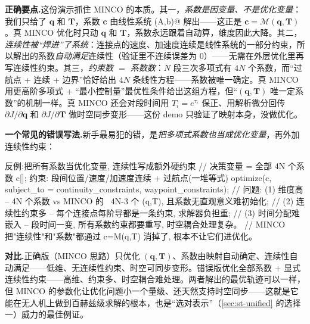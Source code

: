 \noindent\textbf{正确要点.}\;这份演示抓住 MINCO 的本质。其一，\emph{系数是因变量、不是优化变量}：我们只给了 $\mathbf q$ 和 $\mathbf T$，系数 $\mathbf c$ 由线性系统 \verb@Solve(A,b)@ 解出——这正是 $\mathbf c=\mathcal M(\mathbf q,\mathbf T)$。真 MINCO 优化时只动 $\mathbf q$ 和 $\mathbf T$，系数永远跟着自动算，维度因此大降。其二，\emph{连续性被“焊进”了系统}：连接点的速度、加速度连续是线性系统的一部分约束，所以解出的系数\emph{自动满足}连续性（验证里不连续误差为 $0$）——无需在外层优化里再写连续性约束。其三，\emph{约束数 $=$ 系数数}：$N$ 段三次多项式有 $4N$ 个系数，而“过航点 + 连续 + 边界”恰好给出 $4N$ 条线性方程——系数被唯一确定。真 MINCO 用更高阶多项式 + “最小控制量”最优性条件给出这组方程，但“$(\mathbf q,\mathbf T)$ 唯一定系数”的机制一样。真 MINCO 还会对段时间用 $T_i=e^{\tau_i}$ 保正、用解析微分回传 $\partial J/\partial\mathbf q$ 和 $\partial J/\partial\mathbf T$ 做时空同步变形——这份 demo 只验证了映射本身，没做优化。

\noindent{}\textbf{一个常见的错误写法.}\;新手最易犯的错，是\emph{把多项式系数也当成优化变量}，再外加连续性约束：

\begin{codebox}[C++]{反例:把所有系数当优化变量, 连续性写成额外硬约束}
// 决策变量 = 全部 4N 个系数 c[]; 约束: 段间位置/速度/加速度连续 + 过航点(一堆等式)
optimize(c, subject_to = {continuity_constraints, waypoint_constraints});
// 问题: (1) 维度高 -- 4N 个系数 vs MINCO 的 ~4N-3 个 (q,T), 且系数无直观意义难初始化;
//       (2) 连续性约束多 -- 每个连接点每阶导都是一条约束, 求解器负担重;
//       (3) 时间分配难嵌入 -- 段时间一变, 所有系数约束都要重写, 时空耦合处理复杂。
//       MINCO 把"连续性"和"系数"都通过 c=M(q,T) 消掉了, 根本不让它们进优化。
\end{codebox}

\noindent\textbf{对比.}\;正确版（MINCO 思路）只优化 $(\mathbf q,\mathbf T)$、系数由映射自动确定、连续性自动满足——低维、无连续性约束、时空可同步变形。错误版优化全部系数 + 显式连续性约束——高维、约束多、时空耦合难处理。两者解出的最优轨迹可以一样，但 MINCO 的参数化让优化问题小一个量级、还天然支持时空同步——这就是它能在无人机上做到百赫兹级求解的根本，也是“选对表示”（\cref{sec:st-unified} 的选择一）威力的最佳例证。


